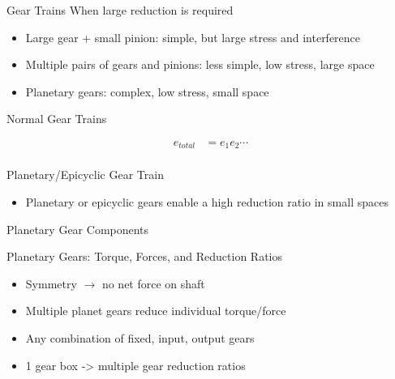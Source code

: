 \documentclass[
10pt,
a4paper,
openany,
svgnames,
]{book}
\begin{document}
\begin{frame}{Gear Trains}
  When large reduction is required
  \begin{itemize}
    \item Large gear + small pinion: simple, but large stress and interference
    \item Multiple pairs of gears and pinions: less simple, low stress, large space
    \item Planetary gears: complex, low stress, small space
  \end{itemize}
\end{frame}

\begin{frame}{Normal Gear Trains}
  \begin{figure}[htbp]
    \centering
  \end{figure}
  \begin{align*}
    e_{total} &= e_{1}e_{2}\cdots \\
  \end{align*}
\end{frame}

\begin{frame}{Planetary/Epicyclic Gear Train}
  \begin{itemize}
    \item Planetary or epicyclic gears enable a high reduction ratio in small spaces
  \end{itemize}
  \begin{figure}[htbp]
    \centering
  \end{figure}
\end{frame}

\begin{frame}{Planetary Gear Components}
  \begin{figure}[htbp]
    \centering
  \end{figure}
\end{frame}

\begin{frame}{Planetary Gears: Torque, Forces, and Reduction Ratios}
  \begin{itemize}
    \item Symmetry $\rightarrow$ no net force on shaft
    \item Multiple planet gears reduce individual torque/force
    \item Any combination of fixed, input, output gears
    \item 1 gear box -> multiple gear reduction ratios
  \end{itemize}
\end{frame}
\end{document}
